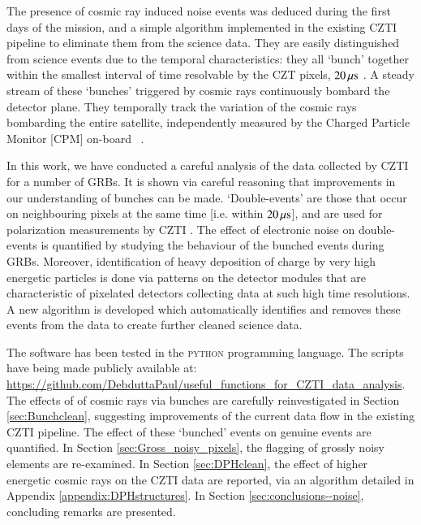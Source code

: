 The presence of cosmic ray induced noise events was deduced during the first days of the mission, and a simple algorithm implemented in the existing CZTI pipeline to eliminate them from the science data. They are easily distinguished from science events due to the temporal characteristics: they all `bunch' together within the smallest interval of time resolvable by the CZT pixels, $20 \, {\rm \mu s}$ \citep{Bhalerao_et_al.-2017-JApA}. A steady stream of these `bunches' triggered by cosmic rays continuously bombard the detector plane. They temporally track the variation of the cosmic rays bombarding the entire satellite, independently measured by the Charged Particle Monitor [CPM] on-board \AS\ \citep{Rao_et_al.-2017-JApA}.

In this work, we have conducted a careful analysis of the data collected by CZTI for a number of GRBs. It is shown via careful reasoning that improvements in our understanding of bunches can be made. `Double-events' are those that occur on neighbouring pixels at the same time [i.e. within $20 \, {\rm \mu s}$], and are used for polarization measurements by CZTI \citep{Chattopadhyay_et_al.-2014-ExA, Chattopadhyay_et_al.-2017-arXiv}. The effect of electronic noise on double-events is quantified by studying the behaviour of the bunched events during GRBs. Moreover, identification of heavy deposition of charge by very high energetic particles is done via patterns on the detector modules that are characteristic of pixelated detectors collecting data at such high time resolutions. A new algorithm is developed which automatically identifies and removes these events from the data to create further cleaned science data.

The software has been tested in the \textsc{python} programming language. The scripts have being made publicly available at: \url{https://github.com/DebduttaPaul/useful_functions_for_CZTI_data_analysis}. The effects of of cosmic rays via bunches are carefully reinvestigated in Section \ref{sec:Bunchclean}, suggesting improvements of the current data flow in the existing CZTI pipeline. The effect of these `bunched' events on genuine events are quantified. In Section \ref{sec:Gross_noisy_pixels}, the flagging of grossly noisy elements are re-examined. In Section \ref{sec:DPHclean}, the effect of higher energetic cosmic rays on the CZTI data are reported, via an algorithm detailed in Appendix \ref{appendix:DPHstructures}. In Section \ref{sec:conclusions--noise}, concluding remarks are presented.


